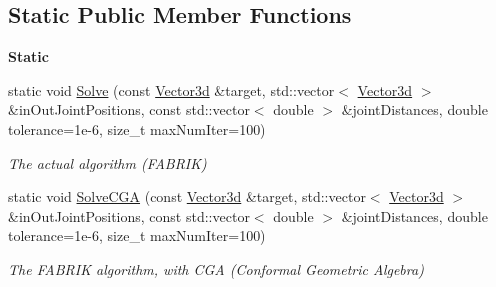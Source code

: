 \subsection*{Static Public Member Functions}
\begin{Indent}\textbf{ Static}\par
\begin{DoxyCompactItemize}
\item 
static void \mbox{\hyperlink{classrev_1_1_i_k_a48bdf55588b6a47ae1ed832977c1905f}{Solve}} (const \mbox{\hyperlink{classrev_1_1_vector}{Vector3d}} \&target, std\+::vector$<$ \mbox{\hyperlink{classrev_1_1_vector}{Vector3d}} $>$ \&in\+Out\+Joint\+Positions, const std\+::vector$<$ double $>$ \&joint\+Distances, double tolerance=1e-\/6, size\+\_\+t max\+Num\+Iter=100)
\begin{DoxyCompactList}\small\item\em The actual algorithm (F\+A\+B\+R\+IK) \end{DoxyCompactList}\item 
static void \mbox{\hyperlink{classrev_1_1_i_k_a69121f5a0869f28cb3f6a7ea53acb4e1}{Solve\+C\+GA}} (const \mbox{\hyperlink{classrev_1_1_vector}{Vector3d}} \&target, std\+::vector$<$ \mbox{\hyperlink{classrev_1_1_vector}{Vector3d}} $>$ \&in\+Out\+Joint\+Positions, const std\+::vector$<$ double $>$ \&joint\+Distances, double tolerance=1e-\/6, size\+\_\+t max\+Num\+Iter=100)
\begin{DoxyCompactList}\small\item\em The F\+A\+B\+R\+IK algorithm, with C\+GA (Conformal Geometric Algebra) \end{DoxyCompactList}\end{DoxyCompactItemize}
\end{Indent}
